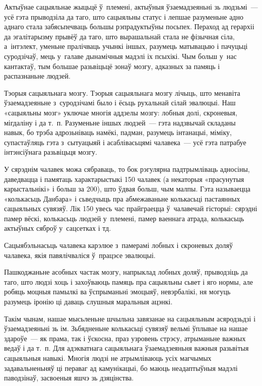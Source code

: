 Актыўнае сацыяльнае жыцьцё ў~племені, актыўныя ўзаемадзеяньні зь людзьмі~--- усё гэта прыводзіла да таго, што сацыяльны статус і лепшае разуменьне адно аднаго стала забясьпечваць большы рэпрадуктыўны посьпех. Пераход ад герархіі да эгалітарызму прывёў да таго, што вырашальнай стала не фізычная сіла, а~інтэлект, уменьне пралічваць учынкі іншых, разумець матывацыю і пачуцьці суродзічаў, мець у~галаве дынамічныя мадэлі іх псыхікі. Чым больш у~нас кантактаў, тым большае разьвіцьцё зонаў мозгу, адказных за памяць і распазнаньне людзей.

Тэорыя сацыяльнага мозгу. Тэорыя сацыяльнага мозгу лічыць, што менавіта ўзаемадзеяньне з~суродзічамі было і ёсьць рухальнай сілай эвалюцыі. Наш «сацыяльны мозг» уключае многія аддзелы мозгу: лобныя долі, скроневыя, мігдаліну і да т.~п. Разуменьне іншых людзей~--- гэта надзвычай складаны навык, бо трэба адрозьніваць намёкі, падман, разумець інтанацыі, міміку, супастаўляць гэта з~сытуацыяй і асаблівасьцямі чалавека~--- усё гэта патрабуе інтэнсіўнага разьвіцьця мозгу.

У сярэднім чалавек можа сябраваць, то бок рэгулярна падтрымліваць адносіны, даведвацца і памятаць характарыстыкі 150 чалавек (а некаторыя «прасунутыя карыстальнікі» і больш за 200), што ўдвая больш, чым малпы. Гэта называецца «колькасьць Данбара» і сьведчыць пра абмежаваньне колькасьці пастаянных сацыяльных сувязяў. Лік 150 увесь час прайграецца ў~чалавечай гісторыі: сярэдні памер вёскі, колькасьць людзей у~племені, памер ваеннага атрада, колькасьць актыўных сяброў у~сацсетках і тд.

Сацыябэльнасьць чалавека карэлюе з~памерамі лобных і скроневых доляў чалавека, якія павялічваліся ў~працэсе эвалюцыі.

Пашкоджаньне асобных частак мозгу, напрыклад лобных доляў, прыводзіць да таго, што людзі хоць і захоўваюць памяць пра сацыяльны сьвет і яго нормы, але робяць моцныя памылкі ва ўспрыманьні эмоцыяў, невэрбалікі, ня могуць разумець іронію ці даваць слушныя маральныя ацэнкі.

Такім чынам, нашае мысьленьне шчыльна завязанае на сацыяльным асяродзьдзі і ўзаемадзеяньні зь ім. Зьбядненьне колькасьці сувязяў вельмі ўплывае на нашае здароўе~--- як прама, так і ўскосна, праз узровень стрэсу, атрыманьне важных ведаў і да т.~п. Для адэкватнага сацыяльнага ўзаемадзеяньня важныя разьвітыя сацыяльныя навыкі. Многія людзі не атрымліваюць усіх магчымых задавальненьняў ці пераваг ад камунікацыі, бо маюць неадаптыўныя мадэлі паводзінаў, засвоеныя яшчэ зь дзяцінства. 

